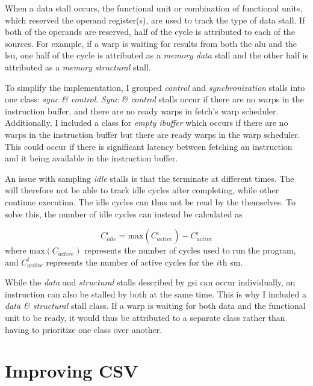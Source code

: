 When a data stall occurs, the functional unit or combination of functional units, which reserved the operand register(s), are used to track the type of data stall. If both of the operands are reserved, half of the cycle is attributed to each of the sources. For example, if a warp is waiting for results from both the \acrshort{alu} and the \acrshort{lsu}, one half of the cycle is attributed as a \textit{memory data} stall and the other half is attributed as a \textit{memory structural} stall. 

To simplify the implementation, I grouped \textit{control} and \textit{synchronization} stalls into one class: \textit{sync \& control}. \textit{Sync \& control} stalls occur if there are no warps in the instruction buffer, and there are no ready warps in fetch's warp scheduler. Additionally, I included a class for \textit{empty ibuffer} which occurs if there are no warps in the instruction buffer but there are ready warps in the warp scheduler. This could occur if there is significant latency between fetching an instruction and it being available in the instruction buffer.

An issue with sampling \textit{idle} stalls is that the  terminate at different times. The  will therefore not be able to track idle cycles after completing, while other  continue execution. The idle cycles can thus not be read by the  themselves. To solve this, the number of idle cycles can instead be calculated as

\begin{equation} \label{eq:idle}
    C^i_{idle} = \textrm{max}(C^i_{active}) - C^i_{active}
\end{equation}
\noindent
where $\textrm{max}(C_{active})$ represents the number of cycles used to run the program, and $C^i_{active}$ represents the number of active cycles for the $i$th \acrshort{sm}.

While the \textit{data} and \textit{structural} stalls described by \acrshort{gsi} can occur individually, an instruction can also be stalled by both at the same time. This is why I included a \textit{data \& structural} stall class. If a warp is waiting for both data and the functional unit to be ready, it would thus be attributed to a separate class rather than having to prioritize one class over another.

\section{Improving CSV} \label{sec:improve_csv}


